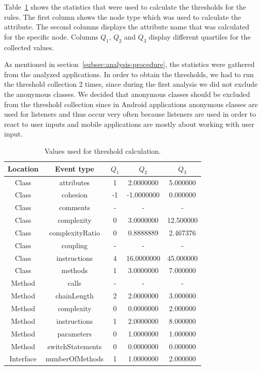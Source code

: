 Table~\ref{threshold_calculation_table} shows the statistics that were used to calculate the thresholds for the rules.
The first column shows the node type which was used to calculate the attribute.
The second columns displays the attribute name that was calculated for the specific node.
Columns $Q_1$, $Q_2$ and $Q_3$ display different quartiles for the collected values.

As mentioned in section~\ref{subsec:analysis-procedure}, the statistics were gathered from the analyzed applications.
In order to obtain the thresholds, we had to run the threshold collection 2 times, since during the first analysis
we did not exclude the anonymous classes.
We decided that anonymous classes should be excluded from the threshold collection since in Android applications
anonymous classes are used for listeners and thus occur very often because listeners are used in order to react to
user inputs and mobile applications are mostly about working with user input.

\begin{table}
    \begin{center}
        \begin{tabular} {| c | c | c | c | c |}
            \hline
            \textbf{Location} & \textbf{Event type} & \textbf{$Q_1$} & \textbf{$Q_2$} & \textbf{$Q_3$} \\ \hline
            Class & attributes & 1 & 2.0000000 & 5.000000 \\ \hline
            Class & cohesion & -1 & -1.0000000 & 0.000000  \\ \hline
            Class & comments & - & - & - \\ \hline
            Class & complexity & 0 & 3.0000000 & 12.500000 \\ \hline
            Class & complexityRatio & 0 & 0.8888889 & 2.467376 \\ \hline
            Class & coupling & - & - & - \\ \hline
            Class & instructions & 4 & 16.0000000 & 45.000000 \\ \hline
            Class & methods & 1 & 3.0000000 & 7.000000 \\ \hline
            Method & calls & - & - & - \\ \hline
            Method & chainLength & 2 & 2.0000000 & 3.000000 \\ \hline
            Method & complexity & 0 & 0.0000000 & 2.000000 \\ \hline
            Method & instructions & 1 & 2.0000000 & 8.000000 \\ \hline
            Method & parameters & 0 & 1.0000000 & 1.000000 \\ \hline
            Method & switchStatements & 0 & 0.0000000 & 0.000000 \\ \hline
            Interface & numberOfMethods & 1 & 1.0000000 & 2.000000 \\ \hline
        \end{tabular}
        \caption{\label{threshold_calculation_table}Values used for threshold calculation.}
    \end{center}
\end{table}

